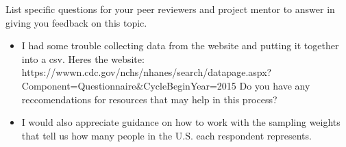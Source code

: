 \documentclass[
  letterpaper,
  DIV=11,
  numbers=noendperiod]{scrartcl}
\begin{document}
List specific questions for your peer reviewers and project mentor to
answer in giving you feedback on this topic.

\begin{itemize}
\item
  I had some trouble collecting data from the website and putting it
  together into a csv. Heres the website:
  https://wwwn.cdc.gov/nchs/nhanes/search/datapage.aspx?Component=Questionnaire\&CycleBeginYear=2015
  Do you have any reccomendations for resources that may help in this
  process?
\item
  I would also appreciate guidance on how to work with the sampling
  weights that tell us how many people in the U.S. each respondent
  represents.
\end{itemize}
\end{document}
